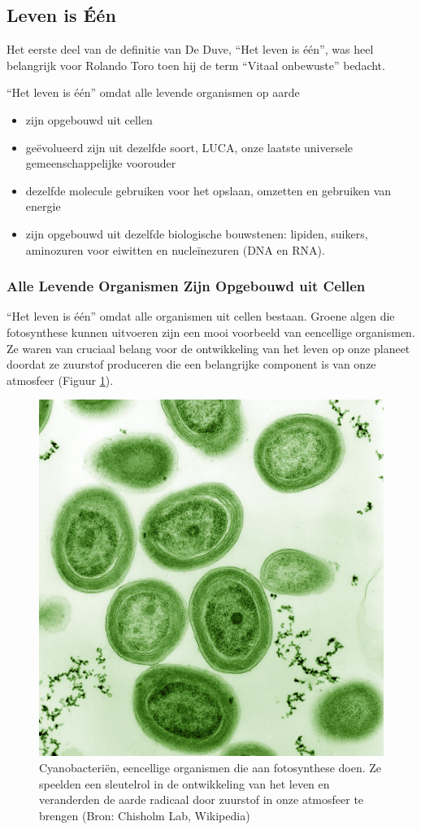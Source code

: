 \documentclass[
  11pt,
]{book}
\providecommand{\tightlist}{%
  \setlength{\itemsep}{0pt}\setlength{\parskip}{0pt}}
\begin{document}
\hypertarget{lifeOne}{%
\subsection{Leven is Één}\label{lifeOne}}

Het eerste deel van de definitie van De Duve, ``Het leven is één'', was heel belangrijk voor Rolando Toro toen hij de term ``Vitaal onbewuste'' bedacht.

``Het leven is één'' omdat alle levende organismen op aarde

\begin{itemize}
\tightlist
\item
  zijn opgebouwd uit cellen
\item
  geëvolueerd zijn uit dezelfde soort, LUCA, onze laatste universele gemeenschappelijke voorouder
\item
  dezelfde molecule gebruiken voor het opslaan, omzetten en gebruiken van energie
\item
  zijn opgebouwd uit dezelfde biologische bouwstenen: lipiden, suikers, aminozuren voor eiwitten en nucleïnezuren (DNA en RNA).
\end{itemize}

\hypertarget{alle-levende-organismen-zijn-opgebouwd-uit-cellen}{%
\subsubsection{Alle Levende Organismen Zijn Opgebouwd uit Cellen}\label{alle-levende-organismen-zijn-opgebouwd-uit-cellen}}

``Het leven is één'' omdat alle organismen uit cellen bestaan. Groene algen die fotosynthese kunnen uitvoeren zijn een mooi voorbeeld van eencellige organismen. Ze waren van cruciaal belang voor de ontwikkeling van het leven op onze planeet doordat ze zuurstof produceren die een belangrijke component is van onze atmosfeer (Figuur \ref{fig:greenAlgae}).

\begin{figure}

{\centering \includegraphics[width=0.3\linewidth]{./figs/Prochlorococcus_marinus} 

}

\caption{Cyanobacteriën, eencellige organismen die aan fotosynthese doen. Ze speelden een sleutelrol in de ontwikkeling van het leven en veranderden de aarde radicaal door zuurstof in onze atmosfeer te brengen (Bron: Chisholm Lab, Wikipedia)}\label{fig:greenAlgae}
\end{figure}
\end{document}
